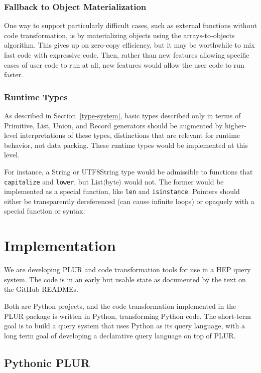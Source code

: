 \documentclass[10pt, conference, compsocconf]{IEEEtran}
\begin{document}
\subsubsection{Fallback to Object Materialization}

One way to support particularly difficult cases, such as external functions without code transformation, is by materializing objects using the arrays-to-objects algorithm. This gives up on zero-copy efficiency, but it may be worthwhile to mix fast code with expressive code. Then, rather than new features allowing specific cases of user code to run at all, new features would allow the user code to run faster.

\subsubsection{Runtime Types}

As described in Section~\ref{type-system}, basic types described only in terms of Primitive, List, Union, and Record generators should be augmented by higher-level interpretations of these types, distinctions that are relevant for runtime behavior, not data packing. These runtime types would be implemented at this level.

For instance, a String or UTF8String type would be admissible to functions that {\tt capitalize} and {\tt lower}, but List$\langle$byte$\rangle$ would not. The former would be implemented as a special function, like {\tt len} and {\tt isinstance}. Pointers should either be transparently dereferenced (can cause infinite loops) or opaquely with a special function or syntax.

\section{Implementation}

We are developing PLUR and code transformation tools\cite{plur} for use in a HEP query system\cite{hepquery}. The code is in an early but usable state as documented by the text on the GitHub READMEs.

Both are Python projects, and the code transformation implemented in the PLUR package is written in Python, transforming Python code. The short-term goal is to build a query system that uses Python as its query language, with a long term goal of developing a declarative query language on top of PLUR.

\subsection{Pythonic PLUR}
\end{document}
